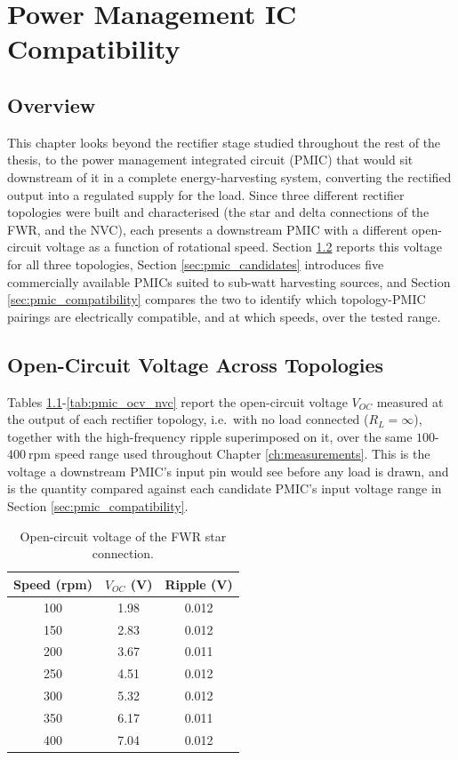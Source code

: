 \chapter{Power Management IC Compatibility}
\label{ch:pmic}

\section{Overview}
\label{sec:pmic_overview}

This chapter looks beyond the rectifier stage studied throughout the rest of the thesis, to the power management integrated circuit (PMIC) that would sit downstream of it in a complete energy-harvesting system, converting the rectified output into a regulated supply for the load. Since three different rectifier topologies were built and characterised (the star and delta connections of the FWR, and the NVC), each presents a downstream PMIC with a different open-circuit voltage as a function of rotational speed. Section \ref{sec:pmic_ocv} reports this voltage for all three topologies, Section \ref{sec:pmic_candidates} introduces five commercially available PMICs suited to sub-watt harvesting sources, and Section \ref{sec:pmic_compatibility} compares the two to identify which topology-PMIC pairings are electrically compatible, and at which speeds, over the tested range.

\section{Open-Circuit Voltage Across Topologies}
\label{sec:pmic_ocv}

Tables \ref{tab:pmic_ocv_star}-\ref{tab:pmic_ocv_nvc} report the open-circuit voltage $V_{OC}$ measured at the output of each rectifier topology, i.e.\ with no load connected ($R_L=\infty$), together with the high-frequency ripple superimposed on it, over the same $100$-$400\ \text{rpm}$ speed range used throughout Chapter \ref{ch:measurements}. This is the voltage a downstream PMIC's input pin would see before any load is drawn, and is the quantity compared against each candidate PMIC's input voltage range in Section \ref{sec:pmic_compatibility}.

\begin{table}[htbp]
    \centering
    \begin{tabular}{ccc}
        \toprule
        Speed (rpm) & $V_{OC}$ (V) & Ripple (V) \\
        \midrule
        100 & 1.98 & 0.012 \\
        150 & 2.83 & 0.012 \\
        200 & 3.67 & 0.011 \\
        250 & 4.51 & 0.012 \\
        300 & 5.32 & 0.012 \\
        350 & 6.17 & 0.011 \\
        400 & 7.04 & 0.012 \\
        \bottomrule
    \end{tabular}
    \caption{Open-circuit voltage of the FWR star connection.}
    \label{tab:pmic_ocv_star}
\end{table}

